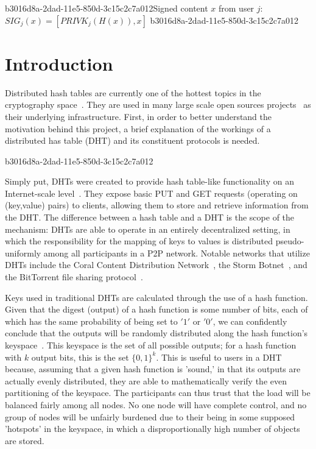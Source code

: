 \documentclass[12pt]{article}
\begin{document}
b3016d8a-2dad-11e5-850d-3c15c2c7a012Signed content $x$ from user $j$: $SIG_j(x) = \left[ PRIVK_j( H(x) ), x \right]$
b3016d8a-2dad-11e5-850d-3c15c2c7a012
\section{Introduction}
\par Distributed hash tables are currently one of the hottest topics in the cryptography space~\cite{Stoica:2001dj,Rowstron:2001ea,Ratnasamy:2001wn}. They are used in many large scale open sources projects~\cite{Freitas:2013tb,Xu:2010vs,Perfitt:2010fh} as their underlying infrastructure. First, in order to better understand the motivation behind this project, a brief explanation of the workings of a distributed has table (DHT) and its constituent protocols is needed.

b3016d8a-2dad-11e5-850d-3c15c2c7a012\par Simply put, DHTs were created to provide hash table-like functionality on an Internet-scale level~\cite{Ratnasamy:2001wn}. They expose basic PUT and GET requests (operating on (key,value) pairs) to clients, allowing them to store and retrieve information from the DHT. The difference between a hash table and a DHT is the scope of the mechanism: DHTs are able to operate in an entirely decentralized setting, in which the responsibility for the mapping of keys to values is distributed pseudo-uniformly among all participants in a P2P network. Notable networks that utilize DHTs include the Coral Content Distribution Network~\cite{Freedman:2004vb}, the Storm Botnet~\cite{Holz:2008uk}, and the BitTorrent file sharing protocol~\cite{Cohen:y1_8mBnw}.

\par Keys used in traditional DHTs are calculated through the use of a hash function. Given that the digest (output) of a hash function is some number of bits, each of which has the same probability of being set to $'1'$ or $'0'$, we can confidently conclude that the outputs will be randomly distributed along the hash function's keyspace~. This keyspace is the set of all possible outputs; for a hash function with $k$ output bits, this is the set $\{0,1\}^k$. This is useful to users in a DHT because, assuming that a given hash function is 'sound,' in that its outputs are actually evenly distributed, they are able to mathematically verify the even partitioning of the keyspace. The participants can thus trust that the load will be balanced fairly among all nodes. No one node will have complete control, and no group of nodes will be unfairly burdened due to their being in some supposed 'hotspots' in the keyspace, in which a disproportionally high number of objects are stored.~
\end{document}
